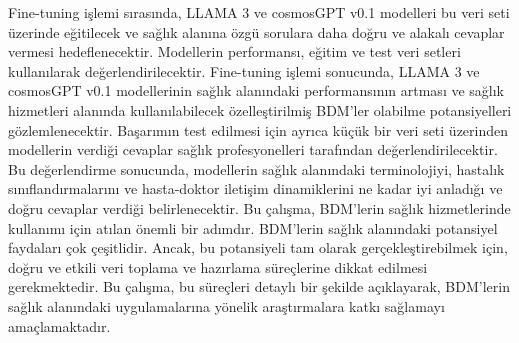 \linebreak
Fine-tuning işlemi sırasında, LLAMA 3 ve cosmosGPT v0.1 modelleri bu veri seti üzerinde eğitilecek ve sağlık alanına özgü sorulara daha doğru ve alakalı cevaplar vermesi hedeflenecektir. Modellerin performansı, eğitim ve test veri setleri kullanılarak değerlendirilecektir. Fine-tuning işlemi sonucunda, LLAMA 3 ve cosmosGPT v0.1 modellerinin sağlık alanındaki performansının artması ve sağlık hizmetleri alanında kullanılabilecek özelleştirilmiş BDM'ler olabilme potansiyelleri gözlemlenecektir.
\linebreak
Başarımın test edilmesi için ayrıca küçük bir veri seti üzerinden modellerin verdiği cevaplar sağlık profesyonelleri tarafından değerlendirilecektir. Bu değerlendirme sonucunda, modellerin sağlık alanındaki terminolojiyi, hastalık sınıflandırmalarını ve hasta-doktor iletişim dinamiklerini ne kadar iyi anladığı ve doğru cevaplar verdiği belirlenecektir.
\linebreak
Bu çalışma, BDM'lerin sağlık hizmetlerinde kullanımı için atılan önemli bir adımdır. BDM'lerin sağlık alanındaki potansiyel faydaları çok çeşitlidir. Ancak, bu potansiyeli tam olarak gerçekleştirebilmek için, doğru ve etkili veri toplama ve hazırlama süreçlerine dikkat edilmesi gerekmektedir. Bu çalışma, bu süreçleri detaylı bir şekilde açıklayarak, BDM'lerin sağlık alanındaki uygulamalarına yönelik araştırmalara katkı sağlamayı amaçlamaktadır.
